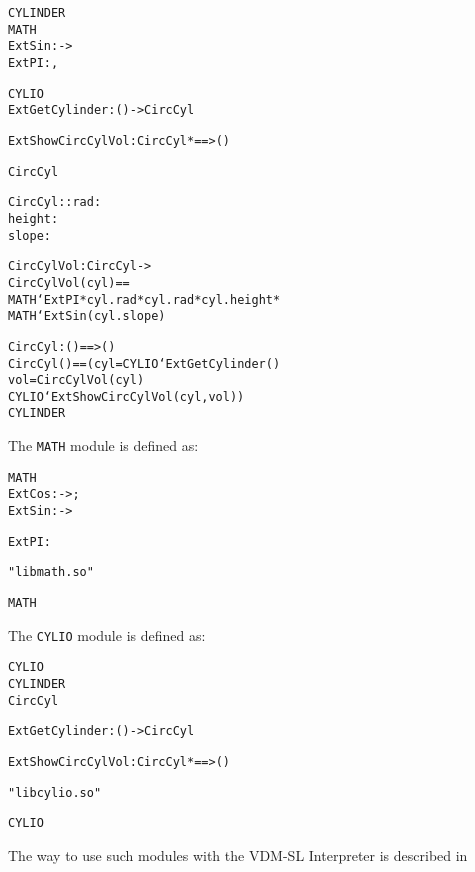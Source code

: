 \documentclass[\pformat,12pt]{article}
\begin{document}
\begin{description}
\begin{alltt}
 CYLINDER
     MATH
          ExtSin :  -> 
          ExtPI : ,

     CYLIO
          ExtGetCylinder : () -> CircCyl
   
          ExtShowCircCylVol : CircCyl *  ==> ()

         CircCyl  

        CircCyl :: rad    : 
                   height : 
                   slope  : 

        CircCylVol : CircCyl -> 
        CircCylVol(cyl) ==
          MATH`ExtPI * cyl.rad * cyl.rad * cyl.height * 
          MATH`ExtSin(cyl.slope)

        CircCyl : () ==> ()
        CircCyl() == (  cyl = CYLIO`ExtGetCylinder()  
                          vol = CircCylVol(cyl) 
                            CYLIO`ExtShowCircCylVol(cyl, vol))
 CYLINDER
\end{alltt}

The {\tt MATH} module is defined as:

\begin{alltt}
 MATH
      ExtCos :  -> ;
      ExtSin :  ->   
      
      ExtPI : 
  
      "libmath.so" 

 MATH
\end{alltt}

The {\tt CYLIO} module is defined as:

\begin{alltt}
 CYLIO
     CYLINDER
        CircCyl

       ExtGetCylinder : () -> CircCyl
   
       ExtShowCircCylVol : CircCyl *  ==> ()

      "libcylio.so"

 CYLIO
\end{alltt}

The way to use such modules with the VDM-SL Interpreter is described
in \cite{DLMan-SCSK}
\end{description}
\end{document}
